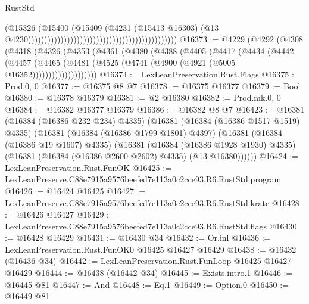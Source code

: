 \begin{lexlean}{RustStd}
\begin{coremodule}
                                                                                      (@15326
                                                                                        (@15400
                                                                                          (@15409
                                                                                            (@4231
                                                                                              (@15413
                                                                                                @16303)
                                                                                              (@13
                                                                                                @4230))))))))))))))))))))))))))))))))))))))))))))))
@16373 := @4229
    (@4292
      (@4308
        (@4318
          (@4326
            (@4353
              (@4361
                (@4380
                  (@4388
                    (@4405
                      (@4417
                        (@4434
                          (@4442
                            (@4457
                              (@4465
                                (@4481 (@4525 (@4741 (@4900 (@4921 (@5005 @16352))))))))))))))))))))
@16374 := LexLeanPreservation.Rust.Flags
@16375 := Prod.{0, 0}
@16377 := @16375 @8 @7
@16378 := @16375 @16377
@16379 := Bool
@16380 := @16378 @16379
@16381 := @2 @16380
@16382 := Prod.mk.{0, 0}
@16384 := @16382 @16377 @16379
@16386 := @16382 @8 @7
@16423 := @16381
    (@16384 (@16386 @232 @234) @4335)
    (@16381
      (@16384 (@16386 @1517 @1519) @4335)
      (@16381
        (@16384 (@16386 @1799 @1801) @4397)
        (@16381
          (@16384 (@16386 @19 @1607) @4335)
          (@16381
            (@16384 (@16386 @1928 @1930) @4335)
            (@16381 (@16384 (@16386 @2600 @2602) @4335) (@13 @16380))))))
@16424 := LexLeanPreservation.Rust.FunOK
@16425 := LexLeanPreserve.C88e7915a9576beefed7e113a0c2cce93.R6.RustStd.program
@16426 := @16424 @16425
@16427 := LexLeanPreserve.C88e7915a9576beefed7e113a0c2cce93.R6.RustStd.krate
@16428 := @16426 @16427
@16429 := LexLeanPreserve.C88e7915a9576beefed7e113a0c2cce93.R6.RustStd.flags
@16430 := @16428 @16429
@16431 := @16430 @34
@16432 := Or.inl
@16436 := LexLeanPreservation.Rust.FunOK0 @16425 @16427 @16429
@16438 := @16432 (@16436 @34)
@16442 := LexLeanPreservation.Rust.FunLoop @16425 @16427 @16429
@16444 := @16438 (@16442 @34)
@16445 := Exists.intro.{1}
@16446 := @16445 @81
@16447 := And
@16448 := Eq.{1}
@16449 := Option.{0}
@16450 := @16449 @81

\end{coremodule}
\end{lexlean}
